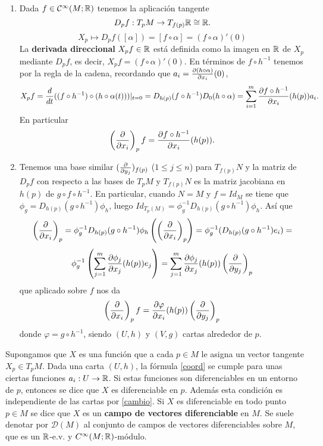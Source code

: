 \documentclass[CV.tex]{subfiles}
\begin{document}
\begin{nota}
\begin{enumerate}
\item Dada $f\in\mathcal{C}^{\infty}(M;\mathbb{R})$ tenemos la aplicación tangente
\[
D_pf:T_pM\to T_{f(p)}\mathbb{R}\cong\mathbb{R}.
\]
\[
X_p\mapsto D_pf([\alpha])=[f\circ\alpha]=(f\circ\alpha)'(0)
\]
La \textbf{derivada direccional} $X_pf\in\mathbb{R}$ está definida como la imagen en $\mathbb{R}$ de $X_p$ mediante $D_pf$, es decir, $X_pf=(f\circ\alpha)'(0)$. En términos de $f\circ h^{-1}$ tenemos por la regla de la cadena, recordando que $a_i=\frac{\partial (h\circ\alpha)}{\partial x_i}(0)$,
\[
X_pf=\frac{d}{dt}((f\circ h^{-1})\circ (h\circ \alpha(t)))|_{t=0}=D_{h(p)}(f\circ h^{-1})D_0(h\circ\alpha)=\sum_{i=1}^m\frac{\partial f\circ h^{-1}}{\partial x_i}(h(p))a_i.
\]
En particular 
\[
\left(\frac{\partial }{\partial x_i}\right)_pf=\frac{\partial f\circ h^{-1}}{\partial x_i}(h(p)).
\]
\item Tenemos una base similar $(\frac{\partial }{\partial y_j})_{f(p)}$ ($1\leq j\leq n$) para $T_{f(p)}N$ y la matriz de $D_pf$ con respecto a las bases de $T_pM$ y $T_{f(p)}N$ es la matriz jacobiana en $h(p)$ de $g\circ f\circ h^{-1}$. En particular, cuando $N=M$ y $f=Id_M$ se tiene que $\phi_g=D_{h(p)}(g\circ h^{-1})\phi_h$, luego $Id_{T_p(M)}=\phi_g^{-1}D_{h(p)}(g\circ h^{-1})\phi_h$. Así que
\[
\left(\frac{\partial }{\partial x_i}\right)_p=\phi_g^{-1}D_{h(p)}(g\circ h^{-1})\phi_h\left(\left(\frac{\partial }{\partial x_i}\right)_p\right)=\phi_g^{-1}(D_{h(p)}(g\circ h^{-1})e_i)=
\]
\[
\phi_g^{-1}\left(\sum_{j=1}^m\frac{\partial \phi_j}{\partial x_j}(h(p))e_j\right)=\sum_{j=1}^m\frac{\partial \phi_j}{\partial x_j}(h(p))\left(\frac{\partial }{\partial y_j}\right)_p
\]
que aplicado sobre $f$ nos da
\begin{equation}\label{cambio}
\left(\frac{\partial }{\partial x_i}\right)_pf=\frac{\partial \varphi}{\partial x_i}(h(p))\left(\frac{\partial }{\partial y_j}\right)_p
\end{equation}
donde $\varphi=g\circ h^{-1}$, siendo $(U,h)$ y $(V,g)$ cartas alrededor de $p$. 
\end{enumerate}
\end{nota}

Supongamos que $X$ es una función que a cada $p\in M$ le asigna un vector tangente $X_p\in T_pM$. Dada una carta $(U,h)$, la fórmula \ref{coord} se cumple para unas ciertas funciones $a_i:U\to\mathbb{R}$. Si estas funciones son diferenciables en un entorno de $p$, entonces se dice que $X$ es diferenciable en $p$. Además esta condición es independiente de las cartas por \ref{cambio}. Si $X$ es diferenciable en todo punto $p\in M$ se dice que $X$ es un \textbf{campo de vectores diferenciable} en $M$. Se suele denotar por $\mathcal{D}(M)$ al conjunto de campos de vectores diferenciables sobre $M$, que es un $\mathbb{R}$-e.v. y $C^{\infty}(M;\mathbb{R})$-módulo. 
\end{document}
